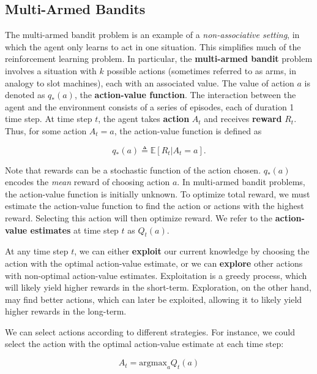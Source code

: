 \subsection{Multi-Armed Bandits}

The multi-armed bandit problem is an example of a \textit{non-associative setting}, in which the agent only learns to act in one situation. This simplifies much of the reinforcement learning problem. In particular, the \textbf{multi-armed bandit} problem involves a situation with $k$ possible actions (sometimes referred to as arms, in analogy to slot machines), each with an associated value. The value of action $a$ is denoted as $q_* (a)$, the \textbf{action-value function}. The interaction between the agent and the environment consists of a series of episodes, each of duration 1 time step. At time step $t$, the agent takes \textbf{action} $A_t$ and receives \textbf{reward} $R_t$. Thus, for some action $A_t = a$, the action-value function is defined as

\begin{equation}
	q_* (a) \triangleq \mathbb{E} \left[ R_t | A_t = a \right].
\end{equation}

\noindent Note that rewards can be a stochastic function of the action chosen. $q_* (a)$ encodes the \textit{mean} reward of choosing action $a$. In multi-armed bandit problems, the action-value function is initially unknown. To optimize total reward, we must estimate the action-value function to find the action or actions with the highest reward. Selecting this action will then optimize reward. We refer to the \textbf{action-value estimates} at time step $t$ as $Q_t (a)$.

At any time step $t$, we can either \textbf{exploit} our current knowledge by choosing the action with the optimal action-value estimate, or we can \textbf{explore} other actions with non-optimal action-value estimates. Exploitation is a greedy process, which will likely yield higher rewards in the short-term. Exploration, on the other hand, may find better actions, which can later be exploited, allowing it to likely yield higher rewards in the long-term.

We can select actions according to different strategies. For instance, we could select the action with the optimal action-value estimate at each time step:

\begin{equation}
A_t = \text{argmax}_a Q_t (a)
\end{equation}

